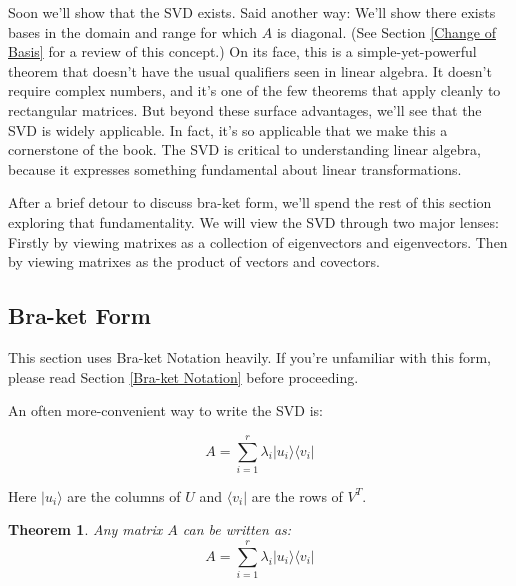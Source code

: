 \documentclass{amsbook}
\newtheorem{theorem}{Theorem}
\begin{document}
Soon we'll show that the SVD exists.  Said another way:  We'll show there exists bases in the domain and range for which $A$ is diagonal.  (See Section \ref{Change of Basis} for a review of this concept.)  On its face, this is a simple-yet-powerful theorem that doesn't have the usual qualifiers seen in linear algebra.  It doesn't require complex numbers, and it's one of the few theorems that apply cleanly to rectangular matrices.  But beyond these surface advantages, we'll see that the SVD is widely applicable.  In fact, it's so applicable that we make this a cornerstone of the book.  The SVD is critical to understanding linear algebra, because it expresses something fundamental about linear transformations.

After a brief detour to discuss bra-ket form, we'll spend the rest of this section exploring that fundamentality.  We will view the SVD through two major lenses:  Firstly by viewing matrixes as a collection of eigenvectors and eigenvectors.  Then by viewing matrixes as the product of vectors and covectors.

\subsection{Bra-ket Form}

This section uses Bra-ket Notation heavily.  If you're unfamiliar with this form, please read Section \ref{Bra-ket Notation} before proceeding.

An often more-convenient way to write the SVD is:

$$
A=\sum_{i=1}^r\lambda_i| u _i\rangle\langle v _i|
$$

\noindent
Here $| u _i\rangle$ are the columns of $U$ and $\langle v _i|$ are the rows of $V^T$.

\begin{theorem}
\label{braket_exists}
Any matrix $A$ can be written as:
$$
A=\sum_{i=1}^r\lambda_i| u _i\rangle\langle v _i|
$$
 \end{theorem}
\end{document}
